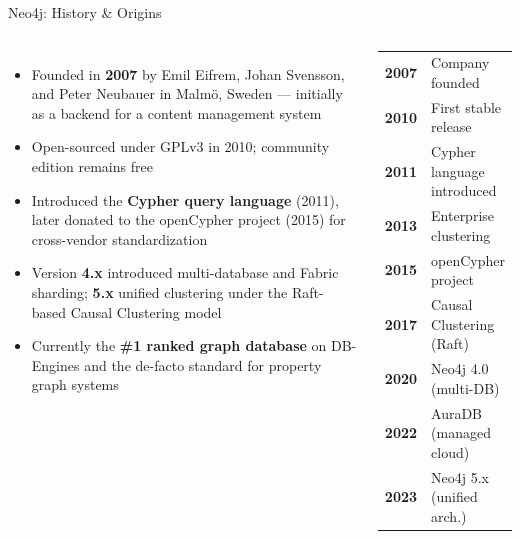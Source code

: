 \documentclass[aspectratio=169]{beamer}
\begin{document}
\begin{frame}{Neo4j: History \& Origins}
  \begin{columns}[T]
      \begin{itemize}\small
        \item Founded in \textbf{2007} by Emil Eifrem, Johan Svensson, and Peter Neubauer in Malmö, Sweden — initially as a backend for a content management system
        \item Open-sourced under GPLv3 in 2010; community edition remains free
        \item Introduced the \textbf{Cypher query language} (2011), later donated to the openCypher project (2015) for cross-vendor standardization
        \item Version \textbf{4.x} introduced multi-database and Fabric sharding; \textbf{5.x} unified clustering under the Raft-based Causal Clustering model
        \item Currently the \textbf{\#1 ranked graph database} on DB-Engines and the de-facto standard for property graph systems
      \end{itemize}
      \begin{tcolorbox}[neo4jbox, title=Key Milestones]
        \scriptsize
        \begin{tabular}{@{}rl@{}}
          \textbf{2007} & Company founded \\
          \textbf{2010} & First stable release \\
          \textbf{2011} & Cypher language introduced \\
          \textbf{2013} & Enterprise clustering \\
          \textbf{2015} & openCypher project \\
          \textbf{2017} & Causal Clustering (Raft) \\
          \textbf{2020} & Neo4j 4.0 (multi-DB) \\
          \textbf{2022} & AuraDB (managed cloud) \\
          \textbf{2023} & Neo4j 5.x (unified arch.) \\
        \end{tabular}
      \end{tcolorbox}
  \end{columns}
\end{frame}
\end{document}
